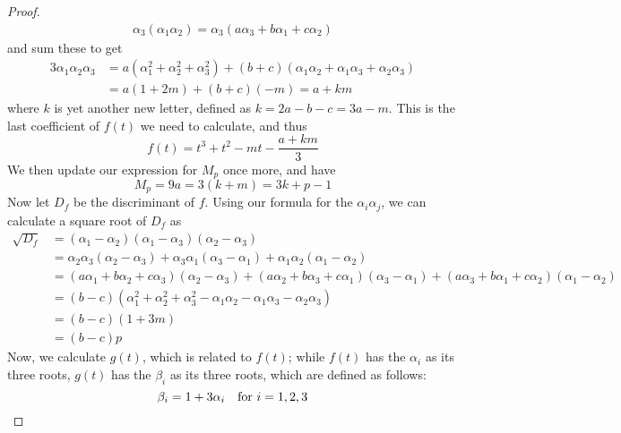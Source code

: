 \begin{proof}
\begin{align*}
	\alpha_3 (\alpha_1 \alpha_2) = \alpha_3 (a\alpha_3 + b\alpha_1 + c\alpha_2)
\end{align*}
and sum these to get
\begin{align*}
	3\alpha_1 \alpha_2 \alpha_3 &= a(\alpha_1^2 + \alpha_2^2 + \alpha_3^2) + (b+c)(\alpha_1\alpha_2 +\alpha_1\alpha_3 +\alpha_2\alpha_3)\\
	&= a(1+2m) +(b+c)(-m) = a + km
\end{align*}
where $k$ is yet another new letter, defined as $k = 2a-b-c=3a-m$. This is the last coefficient of $f(t)$ we need to calculate, and thus
$$f(t) = t^3 + t^2 - mt - \frac{a+km}{3}$$
We then update our expression for $M_p$ once more, and have
$$M_p = 9a = 3(k + m) = 3k + p - 1$$
Now let $D_f$ be the discriminant of $f$. Using our formula for the $\alpha_i \alpha_j$, we can calculate a square root of $D_f$ as
\begin{align*}
	\sqrt{D_f} &= (\alpha_1 - \alpha_2)(\alpha_1 - \alpha_3)(\alpha_2 - \alpha_3)\\
	&= \alpha_2\alpha_3(\alpha_2-\alpha_3) + \alpha_3\alpha_1(\alpha_3-\alpha_1) + \alpha_1\alpha_2(\alpha_1-\alpha_2)\\
	&= (a\alpha_1 + b\alpha_2 + c\alpha_3)(\alpha_2 - \alpha_3) + (a\alpha_2 + b\alpha_3 + c\alpha_1)(\alpha_3 - \alpha_1) + (a\alpha_3 + b\alpha_1 + c\alpha_2)(\alpha_1 - \alpha_2)\\
	&= (b-c)(\alpha_1^2 + \alpha_2^2 + \alpha_3^2 - \alpha_1\alpha_2 - \alpha_1\alpha_3 - \alpha_2\alpha_3)\\
	&= (b-c)(1 + 3m)\\
	&= (b-c)p
\end{align*}
Now, we calculate $g(t)$, which is related to $f(t)$; while $f(t)$ has the $\alpha_i$ as its three roots, $g(t)$ has the $\beta_i$ as its three roots, which are defined as follows:
$$\beta_i = 1 + 3\alpha_i\quad \text{for } i=1,2,3$$
\end{proof}
